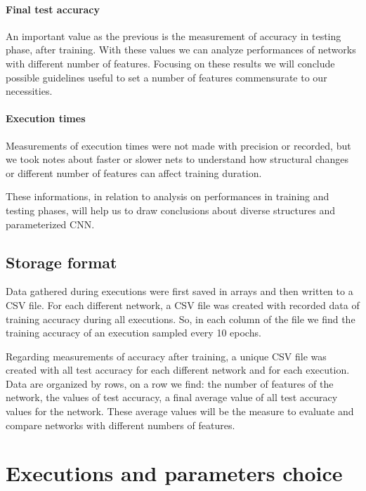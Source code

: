 \paragraph{Final test accuracy}

An important value as the previous is the measurement of accuracy in testing phase, after training. With these values we can analyze performances of networks with different number of features. Focusing on these results we will conclude possible guidelines useful to set a number of features commensurate to our necessities.

\paragraph{Execution times}

Measurements of execution times were not made with precision or recorded, but we took notes about faster or slower nets to understand how structural changes or different number of features can affect training duration.

These informations, in relation to analysis on performances in training and testing phases, will help us to draw conclusions about diverse structures and parameterized \acs{CNN}.

\subsection{Storage format}

Data gathered during executions were first saved in arrays and then written to a CSV file. For each different network, a CSV file was created with recorded data of training accuracy during all executions. So, in each column of the file we find the training accuracy of an execution sampled every 10 epochs.

Regarding measurements of accuracy after training, a unique CSV file was created with all test accuracy for each different network and for each execution. Data are organized by rows, on a row we find: the number of features of the network, the values of test accuracy, a final average value of all test accuracy values for the network. These average values will be the measure to evaluate and compare networks with different numbers of features.

\section{Executions and parameters choice}

